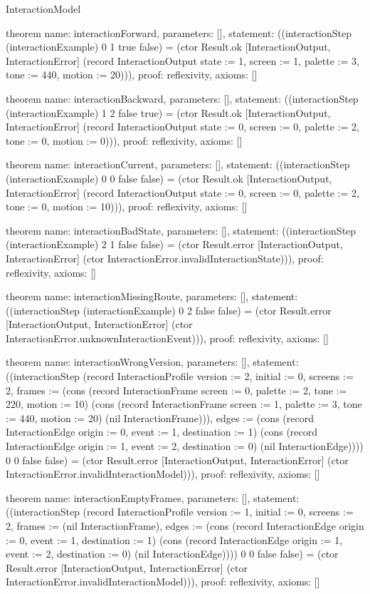 \begin{lexlean}{InteractionModel}
\begin{semanticmodule}
theorem{
  name: interactionForward,
  parameters: [],
  statement: ((interactionStep (interactionExample) 0 1 true false) = (ctor Result.ok [InteractionOutput, InteractionError] (record InteractionOutput {state := 1, screen := 1, palette := 3, tone := 440, motion := 20}))),
  proof: reflexivity{},
  axioms: []
}

theorem{
  name: interactionBackward,
  parameters: [],
  statement: ((interactionStep (interactionExample) 1 2 false true) = (ctor Result.ok [InteractionOutput, InteractionError] (record InteractionOutput {state := 0, screen := 0, palette := 2, tone := 0, motion := 0}))),
  proof: reflexivity{},
  axioms: []
}

theorem{
  name: interactionCurrent,
  parameters: [],
  statement: ((interactionStep (interactionExample) 0 0 false false) = (ctor Result.ok [InteractionOutput, InteractionError] (record InteractionOutput {state := 0, screen := 0, palette := 2, tone := 0, motion := 10}))),
  proof: reflexivity{},
  axioms: []
}

theorem{
  name: interactionBadState,
  parameters: [],
  statement: ((interactionStep (interactionExample) 2 1 false false) = (ctor Result.error [InteractionOutput, InteractionError] (ctor InteractionError.invalidInteractionState))),
  proof: reflexivity{},
  axioms: []
}

theorem{
  name: interactionMissingRoute,
  parameters: [],
  statement: ((interactionStep (interactionExample) 0 2 false false) = (ctor Result.error [InteractionOutput, InteractionError] (ctor InteractionError.unknownInteractionEvent))),
  proof: reflexivity{},
  axioms: []
}

theorem{
  name: interactionWrongVersion,
  parameters: [],
  statement: ((interactionStep (record InteractionProfile {version := 2, initial := 0, screens := 2, frames := (cons (record InteractionFrame {screen := 0, palette := 2, tone := 220, motion := 10}) (cons (record InteractionFrame {screen := 1, palette := 3, tone := 440, motion := 20}) (nil InteractionFrame))), edges := (cons (record InteractionEdge {origin := 0, event := 1, destination := 1}) (cons (record InteractionEdge {origin := 1, event := 2, destination := 0}) (nil InteractionEdge)))}) 0 0 false false) = (ctor Result.error [InteractionOutput, InteractionError] (ctor InteractionError.invalidInteractionModel))),
  proof: reflexivity{},
  axioms: []
}

theorem{
  name: interactionEmptyFrames,
  parameters: [],
  statement: ((interactionStep (record InteractionProfile {version := 1, initial := 0, screens := 2, frames := (nil InteractionFrame), edges := (cons (record InteractionEdge {origin := 0, event := 1, destination := 1}) (cons (record InteractionEdge {origin := 1, event := 2, destination := 0}) (nil InteractionEdge)))}) 0 0 false false) = (ctor Result.error [InteractionOutput, InteractionError] (ctor InteractionError.invalidInteractionModel))),
  proof: reflexivity{},
  axioms: []
}


\end{semanticmodule}
\end{lexlean}
